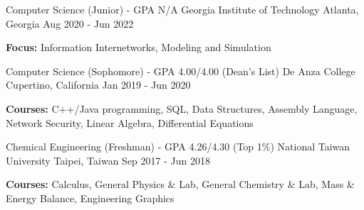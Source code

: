 

\begin{cventries}

  \cventry
    {Computer Science (Junior) - GPA N/A} %
    {Georgia Institute of Technology} %
    {Atlanta, Georgia} %
    {Aug 2020 - Jun 2022} %
   {
		\vspace{-5.0mm}
		\item {\textbf{Focus:} Information Internetworks, Modeling and Simulation} 
   }

  \cventry
    {Computer Science (Sophomore) - GPA 4.00/4.00 (Dean's List)} %
    {De Anza College} %
    {Cupertino, California} %
    {Jan 2019 - Jun 2020} %
   {
		\vspace{-5.0mm}
		\item {\textbf{Courses:} C++/Java programming, SQL, Data Structures, Assembly Language, Network Security, Linear Algebra, Differential Equations}
   }

  \cventry
    {Chemical Engineering (Freshman) - GPA 4.26/4.30 (Top 1\%)} %
    {National Taiwan University} %
    {Taipei, Taiwan} %
    {Sep 2017 - Jun 2018} %
    {
		\vspace{-5.0mm}
		\item {\textbf{Courses:} Calculus, General Physics \& Lab, General Chemistry \& Lab, Mass \& Energy Balance, Engineering Graphics}
	}

\end{cventries}

